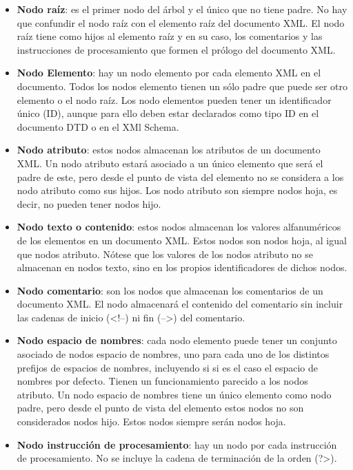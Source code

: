 \begin{itemize}
    \item \textbf{Nodo raíz}: es el primer nodo del árbol y el único que no tiene padre. No hay que confundir el nodo raíz con el elemento raíz del documento XML. El nodo raíz tiene como hijos al elemento raíz y en su caso, los comentarios y las instrucciones de procesamiento que formen el prólogo del documento XML.

    \item \textbf{Nodo Elemento}: hay un nodo elemento por cada elemento XML en el documento. Todos los nodos elemento tienen un sólo padre que puede ser otro elemento o el nodo raíz. Los nodo elementos pueden tener un identificador único (ID), aunque para ello deben estar declarados como tipo ID en el documento DTD o en el XMl Schema.

    \item \textbf{Nodo atributo}: estos nodos almacenan los atributos de un documento XML. Un nodo atributo estará asociado a un único elemento que será el padre de este, pero desde el punto de vista del elemento no se considera a los nodo atributo como sus hijos. Los nodo atributo son siempre nodos hoja, es decir, no pueden tener nodos hijo.

    \item \textbf{Nodo texto o contenido}: estos nodos almacenan los valores alfanuméricos de los elementos en un documento XML. Estos nodos son nodos hoja, al igual que nodos atributo. Nótese que los valores de los nodos atributo no se almacenan en nodos texto, sino en los propios identificadores de dichos nodos.

    \item \textbf{Nodo comentario}: son los nodos que almacenan los comentarios de un documento XML. El nodo almacenará el contenido del comentario sin incluir las cadenas de inicio (<!--) ni fin (-->) del comentario.

    \item \textbf{Nodo espacio de nombres}: cada nodo elemento puede tener un conjunto asociado de nodos espacio de nombres, uno para cada uno de los distintos prefijos de espacios de nombres, incluyendo si si es el caso el espacio de nombres por defecto. Tienen un funcionamiento parecido a los nodos atributo. Un nodo espacio de nombres tiene un único elemento como nodo padre, pero desde el punto de vista del elemento estos nodos no son considerados nodos hijo. Estos nodos siempre serán nodos hoja.

    \item \textbf{Nodo instrucción de procesamiento}: hay un nodo por cada instrucción de procesamiento. No se incluye la cadena de terminación de la orden (?>).
\end{itemize}

